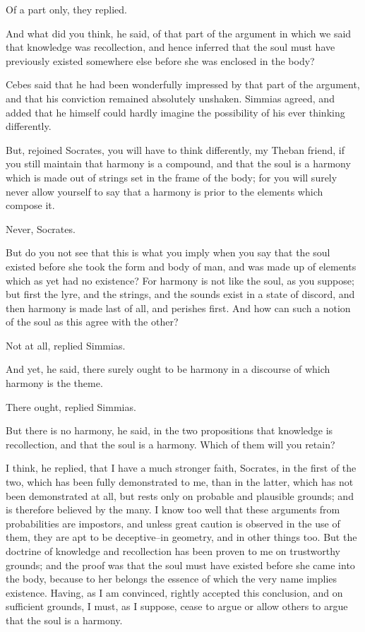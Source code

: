Of a part only, they replied.

And what did you think, he said, of that part of the argument in which
we said that knowledge was recollection, and hence inferred that the
soul must have previously existed somewhere else before she was enclosed
in the body?

Cebes said that he had been wonderfully impressed by that part of the
argument, and that his conviction remained absolutely unshaken. Simmias
agreed, and added that he himself could hardly imagine the possibility
of his ever thinking differently.

But, rejoined Socrates, you will have to think differently, my Theban
friend, if you still maintain that harmony is a compound, and that the
soul is a harmony which is made out of strings set in the frame of the
body; for you will surely never allow yourself to say that a harmony is
prior to the elements which compose it.

Never, Socrates.

But do you not see that this is what you imply when you say that the
soul existed before she took the form and body of man, and was made up
of elements which as yet had no existence? For harmony is not like
the soul, as you suppose; but first the lyre, and the strings, and the
sounds exist in a state of discord, and then harmony is made last of
all, and perishes first. And how can such a notion of the soul as this
agree with the other?

Not at all, replied Simmias.

And yet, he said, there surely ought to be harmony in a discourse of
which harmony is the theme.

There ought, replied Simmias.

But there is no harmony, he said, in the two propositions that knowledge
is recollection, and that the soul is a harmony. Which of them will you
retain?

I think, he replied, that I have a much stronger faith, Socrates, in the
first of the two, which has been fully demonstrated to me, than in
the latter, which has not been demonstrated at all, but rests only on
probable and plausible grounds; and is therefore believed by the many. I
know too well that these arguments from probabilities are impostors, and
unless great caution is observed in the use of them, they are apt to
be deceptive--in geometry, and in other things too. But the doctrine of
knowledge and recollection has been proven to me on trustworthy grounds;
and the proof was that the soul must have existed before she came into
the body, because to her belongs the essence of which the very name
implies existence. Having, as I am convinced, rightly accepted this
conclusion, and on sufficient grounds, I must, as I suppose, cease to
argue or allow others to argue that the soul is a harmony.

